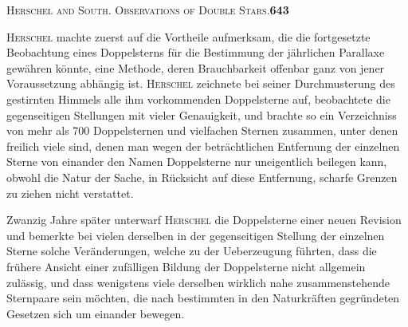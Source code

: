 \documentclass[12pt,a4paper]{article}
\begin{document}
\begin{center}
\small\textsc{Herschel and South. Observations of Double Stars.}\quad\textbf{643}
\end{center}

\textsc{Herschel} machte zuerst auf die Vortheile aufmerksam, die die fortgesetzte Beobachtung eines Doppelsterns f\"ur die Bestimmung der j\"ahrlichen Parallaxe gew\"ahren k\"onnte, eine Methode, deren Brauchbarkeit offenbar ganz von jener Voraussetzung abh\"angig ist. \textsc{Herschel} zeichnete bei seiner Durchmusterung des gestirnten Himmels alle ihm vorkommenden Doppelsterne auf, beobachtete die gegenseitigen Stellungen mit vieler Genauigkeit, und brachte so ein Verzeichniss von mehr als 700 Doppelsternen und vielfachen Sternen zusammen, unter denen freilich viele sind, denen man wegen der betr\"achtlichen Entfernung der einzelnen Sterne von einander den Namen Doppelsterne nur uneigentlich beilegen kann, obwohl die Natur der Sache, in R\"ucksicht auf diese Entfernung, scharfe Grenzen zu ziehen nicht verstattet.

Zwanzig Jahre sp\"ater unterwarf \textsc{Herschel} die Doppelsterne einer neuen Revision und bemerkte bei vielen derselben in der gegenseitigen Stellung der einzelnen Sterne solche Ver\"anderungen, welche zu der Ueberzeugung f\"uhrten, dass die fr\"uhere Ansicht einer zuf\"alligen Bildung der Doppelsterne nicht allgemein zul\"assig, und dass wenigstens viele derselben wirklich nahe zusammenstehende Sternpaare sein m\"ochten, die nach bestimmten in den Naturkr\"aften gegr\"undeten Gesetzen sich um einander bewegen.
\end{document}
